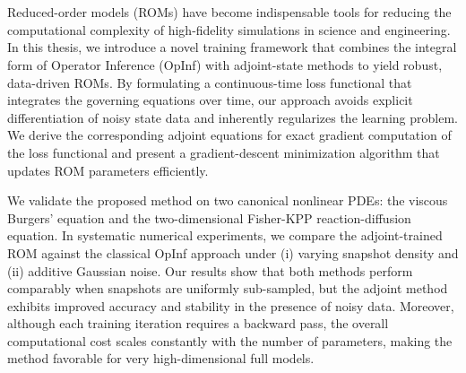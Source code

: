 
\chapter*{\abstractname}


Reduced-order models (ROMs) have become indispensable tools for reducing the computational complexity of high-fidelity simulations in science and engineering.  In this thesis, we introduce a novel training framework that combines the integral form of Operator Inference (OpInf) with adjoint-state methods to yield robust, data-driven ROMs. By formulating a continuous-time loss functional that integrates the governing equations over time, our approach avoids explicit differentiation of noisy state data and inherently regularizes the learning problem. We derive the corresponding adjoint equations for exact gradient computation of the loss functional and present a gradient-descent minimization algorithm that updates ROM parameters efficiently.

We validate the proposed method on two canonical nonlinear PDEs: the viscous Burgers’ equation and the two-dimensional Fisher-KPP reaction-diffusion equation. In systematic numerical experiments, we compare the adjoint-trained ROM against the classical OpInf approach under (i) varying snapshot density and (ii) additive Gaussian noise. Our results show that both methods perform comparably when snapshots are uniformly sub-sampled, but the adjoint method exhibits improved accuracy and stability in the presence of noisy data.  Moreover, although each training iteration requires a backward pass, the overall computational cost scales constantly with the number of parameters, making the method favorable for very high-dimensional full models.



  




